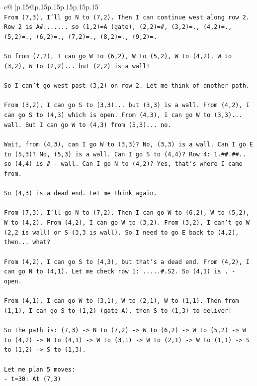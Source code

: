 \documentclass{article}
\begin{document}
{\begin{supertabular}{c@{$\;$}|p{.15\linewidth}@{}p{.15\linewidth}p{.15\linewidth}p{.15\linewidth}p{.15\linewidth}p{.15\linewidth}}
{{{\\ 
\texttt{From (7,3), I'll go N to (7,2). Then I can continue west along row 2. Row 2 is A\#....... so (1,2)=A (gate), (2,2)=\#, (3,2)=., (4,2)=., (5,2)=., (6,2)=., (7,2)=., (8,2)=., (9,2)=.} \\
\\ 
\texttt{So from (7,2), I can go W to (6,2), W to (5,2), W to (4,2), W to (3,2), W to (2,2)... but (2,2) is a wall!} \\
\\ 
\texttt{So I can't go west past (3,2) on row 2. Let me think of another path.} \\
\\ 
\texttt{From (3,2), I can go S to (3,3)... but (3,3) is a wall. From (4,2), I can go S to (4,3) which is open. From (4,3), I can go W to (3,3)... wall. But I can go W to (4,3) from (5,3)... no.} \\
\\ 
\texttt{Wait, from (4,3), can I go W to (3,3)? No, (3,3) is a wall. Can I go E to (5,3)? No, (5,3) is a wall. Can I go S to (4,4)? Row 4: 1.\#\#.\#\#.. so (4,4) is \# {-} wall. Can I go N to (4,2)? Yes, that's where I came from.} \\
\\ 
\texttt{So (4,3) is a dead end. Let me think again.} \\
\\ 
\texttt{From (7,3), I'll go N to (7,2). Then I can go W to (6,2), W to (5,2), W to (4,2). From (4,2), I can go W to (3,2). From (3,2), I can't go W (2,2 is wall) or S (3,3 is wall). So I need to go E back to (4,2), then... what?} \\
\\ 
\texttt{From (4,2), I can go S to (4,3), but that's a dead end. From (4,2), I can go N to (4,1). Let me check row 1: .....\#.S2. So (4,1) is . {-} open.} \\
\\ 
\texttt{From (4,1), I can go W to (3,1), W to (2,1), W to (1,1). Then from (1,1), I can go S to (1,2) (gate A), then S to (1,3) to deliver!} \\
\\ 
\texttt{So the path is: (7,3) {-}> N to (7,2) {-}> W to (6,2) {-}> W to (5,2) {-}> W to (4,2) {-}> N to (4,1) {-}> W to (3,1) {-}> W to (2,1) {-}> W to (1,1) {-}> S to (1,2) {-}> S to (1,3).} \\
\\ 
\texttt{Let me plan 5 moves:} \\
\texttt{{-} t=30: At (7,3)} \\
}}}
\end{supertabular}}
\end{document}

